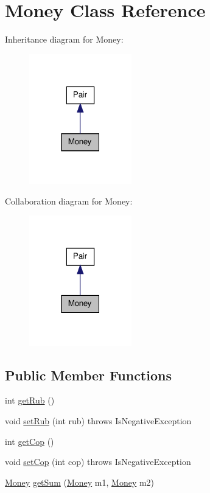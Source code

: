 \hypertarget{class_money}{
\section{Money Class Reference}
\label{class_money}
}


Inheritance diagram for Money:\nopagebreak
\begin{figure}[H]
\begin{center}
\leavevmode
\includegraphics[width=126pt]{class_money__inherit__graph}
\end{center}
\end{figure}


Collaboration diagram for Money:\nopagebreak
\begin{figure}[H]
\begin{center}
\leavevmode
\includegraphics[width=126pt]{class_money__coll__graph}
\end{center}
\end{figure}
\subsection*{Public Member Functions}
\begin{DoxyCompactItemize}
\item 
int \hyperlink{class_money_a42b95df312e95b48cf672d75e541919c}{getRub} ()
\item 
void \hyperlink{class_money_a9bbcd60470cc59f1fce70b7bfbde979e}{setRub} (int rub)  throws IsNegativeException 
\item 
int \hyperlink{class_money_ad486afdb95d8959a7b6c9d840acaaad1}{getCop} ()
\item 
void \hyperlink{class_money_a2c507c1489bdcfa16db52b5f7e953403}{setCop} (int cop)  throws IsNegativeException 
\item 
\hyperlink{class_money}{Money} \hyperlink{class_money_a8b099797a71102fe8f412c7d49e1f9ad}{getSum} (\hyperlink{class_money}{Money} m1, \hyperlink{class_money}{Money} m2)
\end{DoxyCompactItemize}
